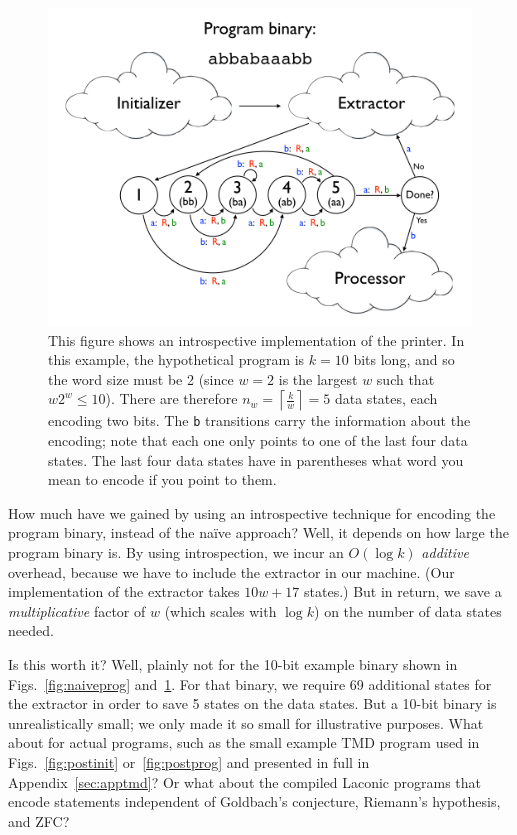 \documentclass[11pt]{article}
\begin{document}
\begin{figure}
\begin{center}
\includegraphics[scale=0.42]{figs/introspectprog.png}
\caption{This figure shows an introspective implementation of the printer. In this example, the hypothetical program is $k=10$ bits long, and so the word size must be 2 (since $w=2$ is the largest $w$ such that $w2^w \le 10$). There are therefore $n_w = \left \lceil{\frac{k}{w}}\right \rceil = 5$ data states, each encoding two bits. The \texttt{b} transitions carry the information about the encoding; note that each one only points to one of the last four data states. The last four data states have in parentheses what word you mean to encode if you point to them. \label{fig:introspectprog}}
\end{center}
\end{figure}

How much have we gained by using an introspective technique for encoding the program binary, instead of the na\"ive approach? Well, it depends on how large the program binary is. By using introspection, we incur an $O(\log k)$ \emph{additive} overhead, because we have to include the extractor in our machine. (Our implementation of the extractor takes $10w + 17$ states.) But in return, we save a \emph{multiplicative} factor of $w$ (which scales with $\log k$) on the number of data states needed. 

Is this worth it? Well, plainly not for the 10-bit example binary shown in Figs.~\ref{fig:naiveprog} and~\ref{fig:introspectprog}. For that binary, we require 69 additional states for the extractor in order to save 5 states on the data states. But a 10-bit binary is unrealistically small; we only made it so small for illustrative purposes. What about for actual programs, such as the small example TMD program used in Figs.~\ref{fig:postinit} or~\ref{fig:postprog} and presented in full in Appendix~\ref{sec:apptmd}? Or what about the compiled Laconic programs that encode statements independent of Goldbach's conjecture, Riemann's hypothesis, and ZFC?
\end{document}
